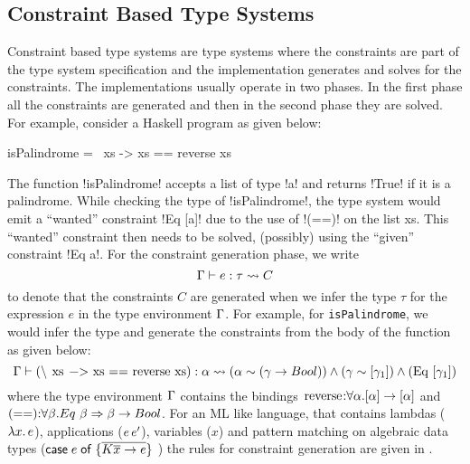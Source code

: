\documentclass[manuscript,screen,nonacm]{acmart}
\begin{document}
\subsection{Constraint Based Type Systems}
Constraint based type systems are type systems where the constraints are part of the type system specification and the implementation generates and solves for the constraints. The implementations usually operate in two phases. In the first phase all the constraints are generated and then in the second phase they are solved. For example, consider a Haskell program as given below:
\begin{codef}
isPalindrome = \ xs -> xs == reverse xs
\end{codef}
The function !isPalindrome! accepts a list of type !a! and returns !True! if it is a palindrome. While checking the type of !isPalindrome!, the type system would emit a ``wanted'' constraint !Eq [a]! due to the use of !(==)! on the list xs. This ``wanted'' constraint then needs to be solved, (possibly) using the ``given'' constraint !Eq a!. For the constraint generation phase, we write
\newcommand\GenConstraints[4]{#1 \vdash #2 : #3 \rightsquigarrow #4}
$$
\GenConstraints \TEnv e \tau C
$$
to denote that the constraints $C$ are generated when we infer the type $\tau$ for the expression $e$ in the type environment $\Gamma$. For example, for \lstinline{isPalindrome}, we would infer the type and generate the constraints from the body of the function as given below:
$$
\TEnv \vdash \text{(\lstinline {\\ xs -> xs == reverse xs})} : \TyVar \rightsquigarrow (\TyVar \sim (\Co \to Bool)) \land (\Co \sim [\Co_1]) \land (\text{\lstinline{Eq}}~ [\Co_1])
$$
where the type environment $\Gamma$ contains the bindings $\text{\lstinline{reverse}}\co\forall \TyVar. [\TyVar] \to [\TyVar]$ and $\text{\lstinline{(==)}}\co\forall \beta. Eq~\beta \then \beta \to Bool$.
For an ML like language, that contains lambdas ($\lambda x.\, e$), applications ($e \, e'$), variables ($x$) and pattern matching on algebraic data types ($\mathsf{case}\;e\;\mathsf{of}\;\{\overline{K \overline x \to e}\}$ ) the rules for constraint generation are given in .
\end{document}
